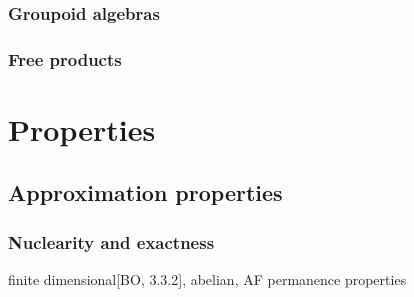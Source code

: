 \documentclass{../../large}
\begin{document}
\section{Groupoid algebras}





\section{Free products}






\part{Properties}
\chapter{Approximation properties}
\section{Nuclearity and exactness}

finite dimensional[BO, 3.3.2], abelian, AF
permanence properties
\end{document}
